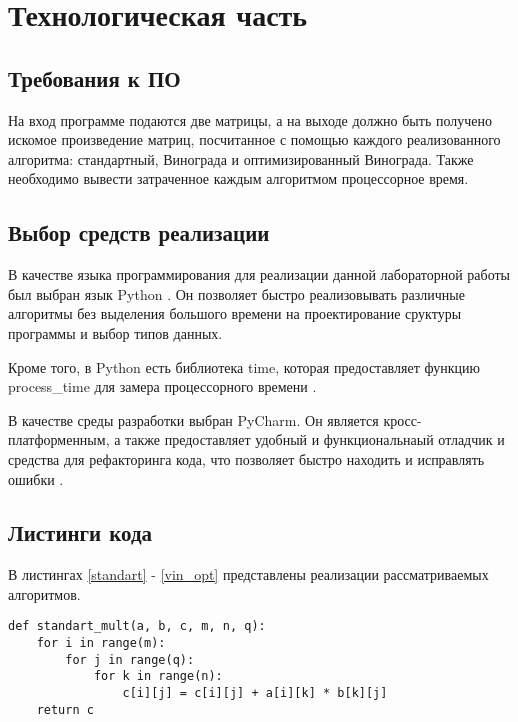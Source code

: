 \chapter{Технологическая часть}

\section{Требования к ПО}

На вход программе подаются две матрицы, а на выходе должно быть получено искомое произведение матриц, посчитанное с помощью каждого реализованного алгоритма: стандартный, Винограда и оптимизированный Винограда. Также необходимо вывести затраченное каждым алгоритмом процессорное время.

\section{Выбор средств реализации}

В качестве языка программирования для реализации данной лабораторной работы был выбран язык Python  \cite{PythonBook}. Он позволяет быстро реализовывать различные алгоритмы без выделения большого времени на проектирование сруктуры программы и выбор типов данных. 

Кроме того, в Python есть библиотека time, которая предоставляет функцию process\_time для замера процессорного времени \cite{process_time_text}.

В качестве среды разработки выбран PyCharm. Он является кросс-платформенным, а также предоставляет удобный и функциональнаый отладчик и средства для рефакторинга кода, что позволяет быстро находить и исправлять ошибки \cite{pycharm}.

\section{Листинги кода}

В листингах \ref{standart} - \ref{vin_opt} представлены реализации рассматриваемых алгоритмов.

\begin{lstlisting}[caption=Стандартный алгоритм умножения матриц,
	label={standart}]
def standart_mult(a, b, c, m, n, q):
	for i in range(m):
		for j in range(q):
			for k in range(n):
				c[i][j] = c[i][j] + a[i][k] * b[k][j]
	return c
\end{lstlisting}


